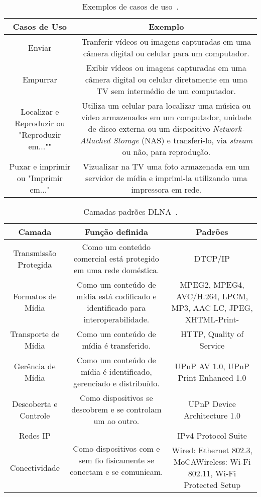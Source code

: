 \begin{table}
	\begin{center}
		\begin{tabular}{cc}
		\hline
		\textbf{Casos de Uso} & \textbf{Exemplo}																\\
		\hline
		Enviar & Tranferir vídeos ou imagens capturadas em uma câmera digital ou celular para um computador.	\\
		\hline
		Empurrar & Exibir vídeos ou imagens capturadas em uma câmera digital ou celular diretamente em uma TV sem intermédio de um computador. \\
		\hline
		Localizar e Reproduzir ou "Reproduzir em..."" & Utiliza um celular para localizar uma música ou vídeo armazenados em um computador, unidade de disco externa ou um dispositivo \emph{Network-Attached Storage} (NAS) e transferi-lo, via \emph{stream} ou não, para reprodução. \\
		\hline
		Puxar e imprimir ou "Imprimir em..." & Vizualizar na TV uma foto armazenada em um servidor de mídia e imprimi-la utilizando uma impressora em rede. \\
		\hline
		\end{tabular}
	\end{center}
	\caption{Exemplos de casos de uso~\cite{dlnahdvideostreaming}.}
	\label{tab:casosdeuso_dlna}
\end{table}

\begin{table}
	\begin{center}
		\begin{tabular}{ccc}
		\hline
		\textbf{Camada} & \textbf{Função definida} & \textbf{Padrões}				\\
		\hline
		Transmissão Protegida & Como um conteúdo comercial está protegido em uma rede doméstica. & DTCP/IP \\
		\hline
		Formatos de Mídia & Como um conteúdo de mídia está codificado e identificado para interoperabilidade. & MPEG2, MPEG4, AVC/H.264, LPCM, MP3, AAC LC, JPEG, XHTML-Print- \\
		\hline
		Transporte de Mídia & Como um conteúdo de mídia é transferido. & HTTP, Quality of Service \\
		\hline
		Gerência de Mídia & Como um conteúdo de mídia é identificado, gerenciado e distribuído. & UPnP AV 1.0, UPnP Print Enhanced 1.0 \\
		\hline
		Descoberta e Controle & Como dispositivos se descobrem e se controlam um ao outro. & UPnP Device Architecture 1.0 \\
		\hline
		Redes IP & \multirow{2}{*}{Como dispositivos com e sem fio fisicamente se conectam e se comunicam.} & IPv4 Protocol Suite \\
		\hline
		Conectividade & & Wired: Ethernet 802.3, MoCAWireless: Wi-Fi 802.11, Wi-Fi Protected Setup \\
		\hline
		\end{tabular}
	\end{center}
	\caption{Camadas padrões DLNA~\cite{dlnahdvideostreaming}.}
	\label{tab:camadaspadroes_dlna}
\end{table}
